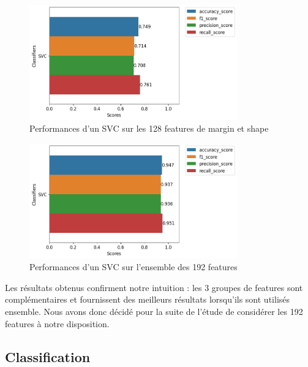 \documentclass{article}
\begin{document}
\begin{figure}[h]
    \centering
    \includegraphics[width=0.8\textwidth]{img/svc_perfs_without_texture.png}
    \caption{Performances d'un SVC sur les 128 features de margin et shape}
\end{figure}

\begin{figure}[h]
    \centering
    \includegraphics[width=0.8\textwidth]{img/svc_perfs_all_data.png}
    \caption{Performances d'un SVC sur l'ensemble des 192 features}
\end{figure}
\newpage

Les résultats obtenus confirment notre intuition : les 3 groupes de features sont complémentaires
et fournissent des meilleurs résultats lorsqu'ils sont utilisés ensemble. Nous avons donc
décidé pour la suite de l'étude de considérer les 192 features à notre disposition.

\newpage
\subsection{Classification}
\end{document}
